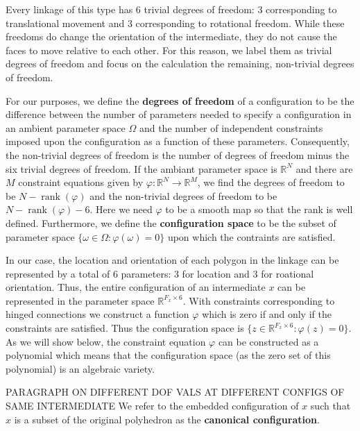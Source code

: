 
Every linkage of this type has 6 trivial degrees of freedom: 3 corresponding to translational movement and 3 corresponding to rotational freedom. While these freedoms do change the orientation of the intermediate, they do not cause the faces to move relative to each other. For this reason, we label them as trivial degrees of freedom and focus on the calculation the remaining, non-trivial degrees of freedom. 

For our purposes, we define the \textbf{degrees of freedom} of a configuration to be the difference between the number of parameters needed to specify a configuration in an ambient parameter space $\Omega$ and the number of independent constraints imposed upon the configuration as a function of these parameters. Consequently, the non-trivial degrees of freedom is the number of degrees of freedom minus the six trivial degrees of freedom. If the ambiant parameter space is $\mathbb{R}^N$ and there are $M$ constraint equations given by $\varphi : \mathbb{R}^N \to \mathbb{R}^M$, we find the degrees of freedom to be $N - \operatorname{rank}(\varphi)$ and the non-trivial degrees of freedom to be $N - \operatorname{rank}(\varphi) - 6$. Here we need $\varphi$ to be a smooth map so that the rank is well defined. Furthermore, we define the \textbf{configuration space} to be the subset of parameter space $\{\omega \in \Omega : \varphi(\omega) = 0\}$ upon which the contraints are satisfied.

In our case, the location and orientation of each polygon in the linkage can be represented by a total of 6 parameters: 3 for location and 3 for roational orientation. Thus, the entire configuration of an intermediate $x$ can be represented in the parameter space $\mathbb{R}^{F_x\times6}$. With constraints corresponding to hinged connections we construct a function $\varphi$ which is zero if and only if the constraints are satisfied. Thus the configuration space is $\{z \in \mathbb{R}^{F_x\times6} : \varphi(z) =0\}$. As we will show below, the constraint equation $\varphi$ can be constructed as a polynomial which means that the configuration space (as the zero set of this polynomial) is an algebraic variety. 

 PARAGRAPH ON DIFFERENT DOF VALS AT DIFFERENT CONFIGS OF SAME INTERMEDIATE We refer to the embedded configuration of $x$ such that $x$ is a subset of the original polyhedron as the \textbf{canonical configuration}.

